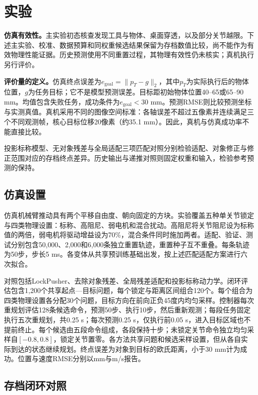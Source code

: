 \documentclass[UTF8,a4paper,10pt,twocolumn]{ctexart}
\begin{document}
\section{实验}

\textbf{仿真有效性。}主实验初态核查发现工具与物体、桌面穿透，以及部分关节越限。下述主实验、校准、数据预算和同权重候选结果保留为存档数值比较，尚不能作为有效物理性能证据。历史预测使用不同重置过程，其物理有效性仍未核实；真机执行另行评价。

\textbf{评价量的定义。}仿真终点误差为$e_{\mathrm{goal}}=\|p_T-g\|_2$，其中$p_T$为实际执行后的物体位置，$g$为任务目标；它不是模型预测误差。目标距初始物体位置40--65或65--90 mm。均值包含失败任务，成功条件为$e_{\mathrm{goal}}<30$ mm。预测RMSE则比较预测坐标与实测真值。真机采用不同的图像空间标准：各轴误差不超过五像素并连续满足三个不同观测帧，核心目标位移20像素（约35.1 mm）。因此，真机与仿真成功率不能直接比较。

投影标称模型、无对象残差与全局适配三项匹配对照分别检验适配、对象修正与修正范围对应的存档终点差异。历史输出与递推对照则固定权重和输入，检验参考预测的保持。

\subsection{仿真设置}

仿真机械臂推动具有两个平移自由度、朝向固定的方块。实验覆盖五种单关节锁定与四类物理设置：标称、高阻尼、弱电机和混合扰动。高阻尼将关节阻尼设为标称值的两倍，弱电机将驱动增益设为70\%，混合条件同时施加两者。适配、验证、测试分别包含50,000、2,000和6,000条独立重置轨迹，重置种子互不重叠。每条轨迹为50步，步长5 ms。各变体从共享预训练基础出发，按上述匹配适配方案进行六次拟合。

对照包括LockPusher、去除对象残差、全局残差适配和投影标称动力学。闭环评估包含1,200个共享起点—目标问题，每个锁定与距离区间组合120个。每个组合为四类物理设置各分配30个问题，目标方向在前向正负45度内均匀采样。控制器每次重规划评估128条候选命令，预测50步、执行10步，然后重新观测；每段任务固定执行五次重规划，共0.25 s；每次预测0.25 s，仅执行前0.05 s，进入目标区域也不提前终止。每个候选由五段命令组成，各段保持十步；未锁定关节命令独立均匀采样自$[-0.8,0.8]$，锁定关节置零。各方法共享问题和候选采样设置，但从各自实际到达的状态继续规划。终点误差为对象到目标的欧氏距离，小于30 mm计为成功。位置与速度RMSE分别以mm与m/s报告。

\subsection{存档闭环对照}
\end{document}
